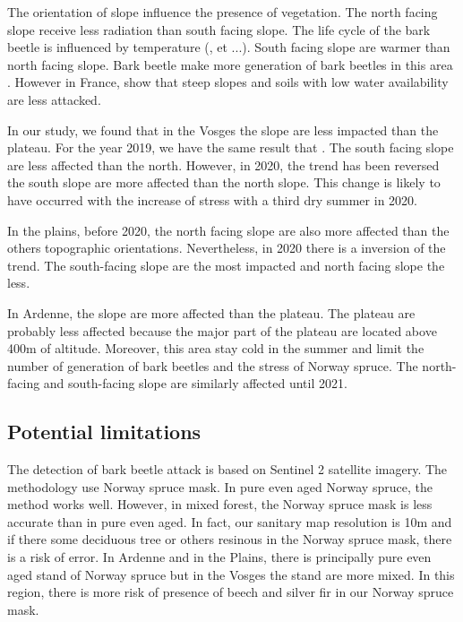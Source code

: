 \documentclass[3p,procedia]{elsarticle}
\begin{document}
The orientation of slope influence the presence of vegetation. The north facing slope receive less radiation than south facing slope. 
The life cycle of the bark beetle is influenced by temperature (\cite{baier_phenipscomprehensive_2007}, et ...). South facing slope are warmer than north facing slope.
Bark beetle make more generation of bark beetles in this area \cite{}. 
However in France, \cite{nardi_drought_2022} show that steep slopes and soils with low water availability are less attacked. 

In our study, we found that in the Vosges the slope are less impacted than the plateau. 
For the year 2019, we have the same result that \cite{nardi_drought_2022}. 
The south facing slope are less affected than the north. 
However, in 2020, the trend has been reversed the south slope are more affected than the north slope. 
This change is likely to have occurred with the increase of stress with a third dry summer in 2020.

In the plains, before 2020, the north facing slope are also more affected than the others topographic orientations. 
Nevertheless, in 2020 there is a inversion of the trend. 
The south-facing slope are the most impacted and north facing slope the less.

In Ardenne, the slope are more affected than the plateau. The plateau are probably less affected because the major part of the plateau are located above 400m of altitude.
Moreover, this area stay cold in the summer and limit the number of generation of bark beetles and the stress of Norway spruce.
The north-facing and south-facing slope are similarly affected until 2021. 


 

\subsection{Potential limitations}
The detection of bark beetle attack is based on Sentinel 2 satellite imagery.
The methodology use Norway spruce mask. 
In pure even aged Norway spruce, the method works well. 
However, in mixed forest, the Norway spruce mask is less accurate than in pure even aged.
In fact, our sanitary map resolution is 10m and if there some deciduous tree or others resinous in the Norway spruce mask, there is a risk of error.
In Ardenne and in the Plains, there is principally pure even aged stand of Norway spruce but in the Vosges the stand are more mixed.
In this region, there is more risk of presence of beech and silver fir in our Norway spruce mask.
\end{document}
